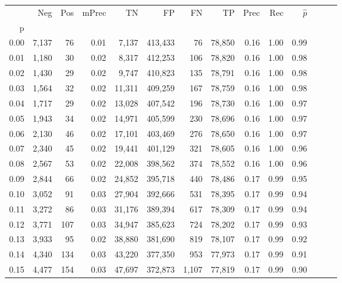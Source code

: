\begin{tabular}{rrrrrrrrrrrrrr}
\toprule
{} &    Neg &    Pos & mPrec &       TN &       FP &      FN &      TP &  Prec &   Rec & $\hat{p}$ \\
p    &        &        &       &          &          &         &         &       &       &           \\
\midrule
0.00 &  7,137 &     76 &  0.01 &    7,137 &  413,433 &      76 &  78,850 &  0.16 &  1.00 &      0.99 \\
0.01 &  1,180 &     30 &  0.02 &    8,317 &  412,253 &     106 &  78,820 &  0.16 &  1.00 &      0.98 \\
0.02 &  1,430 &     29 &  0.02 &    9,747 &  410,823 &     135 &  78,791 &  0.16 &  1.00 &      0.98 \\
0.03 &  1,564 &     32 &  0.02 &   11,311 &  409,259 &     167 &  78,759 &  0.16 &  1.00 &      0.98 \\
0.04 &  1,717 &     29 &  0.02 &   13,028 &  407,542 &     196 &  78,730 &  0.16 &  1.00 &      0.97 \\
0.05 &  1,943 &     34 &  0.02 &   14,971 &  405,599 &     230 &  78,696 &  0.16 &  1.00 &      0.97 \\
0.06 &  2,130 &     46 &  0.02 &   17,101 &  403,469 &     276 &  78,650 &  0.16 &  1.00 &      0.97 \\
0.07 &  2,340 &     45 &  0.02 &   19,441 &  401,129 &     321 &  78,605 &  0.16 &  1.00 &      0.96 \\
0.08 &  2,567 &     53 &  0.02 &   22,008 &  398,562 &     374 &  78,552 &  0.16 &  1.00 &      0.96 \\
0.09 &  2,844 &     66 &  0.02 &   24,852 &  395,718 &     440 &  78,486 &  0.17 &  0.99 &      0.95 \\
0.10 &  3,052 &     91 &  0.03 &   27,904 &  392,666 &     531 &  78,395 &  0.17 &  0.99 &      0.94 \\
0.11 &  3,272 &     86 &  0.03 &   31,176 &  389,394 &     617 &  78,309 &  0.17 &  0.99 &      0.94 \\
0.12 &  3,771 &    107 &  0.03 &   34,947 &  385,623 &     724 &  78,202 &  0.17 &  0.99 &      0.93 \\
0.13 &  3,933 &     95 &  0.02 &   38,880 &  381,690 &     819 &  78,107 &  0.17 &  0.99 &      0.92 \\
0.14 &  4,340 &    134 &  0.03 &   43,220 &  377,350 &     953 &  77,973 &  0.17 &  0.99 &      0.91 \\
0.15 &  4,477 &    154 &  0.03 &   47,697 &  372,873 &   1,107 &  77,819 &  0.17 &  0.99 &      0.90 \\

\end{tabular}
